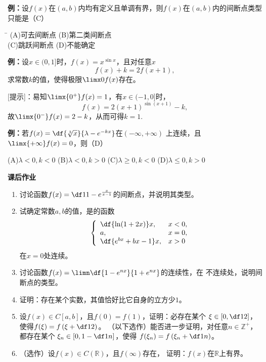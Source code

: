{\bf 例：}设$f(x)$在$(a,b)$内均有定义且单调有界，则$f(x)$在$(a,b)$内的间断点类型只能是（C）
\begin{tabbing}
	\hspace{8cm}\=\kill
	\quad\quad\quad
	(A)\;可去间断点 \> 
	(B)\;第二类间断点 \\ 
	\quad\quad\quad
	(C)\;跳跃间断点\>
	(D)\;不能确定
\end{tabbing}

{\bf 例：}设$x\in(0,1]$时，$f(x)=x^{\sin x}$，且对任意$x$
$$f(x)+k=2f(x+1),$$
求常数$k$的值，使得极限$\limx0f(x)$存在。

[提示]：易知$\limx{0^+}f(x)=1$，有$x\in(-1,0]$时，
$$f(x)=2(x+1)^{\sin(x+1)}-k,$$
故$\limx{0^-}f(x)=2-k$，从而可得$k=1$.

{\bf 例：}若$f(x)=\df{\sqrt[3]{x}}{\lambda-e^{-kx}}$在$(-\infty,+\infty)$
上连续，且$\limx{+\infty}f(x)=0$，则（D）

\quad
(A)\;$\lambda<0,k<0$\hspace{1cm}
(B)\;$\lambda<0,k>0$\hspace{1cm}
(C)\;$\lambda\geq0,k<0$\hspace{1cm}
(D)\;$\lambda\leq0,k>0$

\begin{ext}
	{\centering\bf 课后作业}
	
	\begin{enumerate}  
	  \item 讨论函数$f(x)=\df1{1-e^{\frac{x}{x-1}}}$的间断点，并说明其类型。
	  \item 试确定常数$a,b$的值，是的函数
	  $$
	  	\left\{\begin{array}{ll}
	  		\df{\ln(1+2x)}x,& x<0,\\
	  		a,& x=0,\\
	  		\df{e^{bx}+bx-1}x,& x>0
	  	\end{array}\right.
	  $$
	  在$x=0$处连续。
	  \item 讨论函数$f(x)=\limn\df{1-e^{nx}}{1+e^{nx}}$的连续性，在
	  不连续处，说明间断点的类型。
	  \item 证明：存在某个实数，其值恰好比它自身的立方少$1$。
	  \item 设$f(x)\in C[a,b]$，且$f(0)=f(1)$，证明：必存在某个
	  $\xi\in\left[0,\df12\right]$，使得$f(\xi)=f\left(\xi+\df12\right)$。
	  （以下选作）能否进一步证明，对任意$n\in\mathbb{Z}^+$，都存在某个
	  $\xi_n\in\left[0,1-\df1n\right]$，使得
	  $f(\xi_n)=f\left(\xi_n+\df1n\right)$。
	  \item （选作）设$f(x)\in C(\mathbb{R})$，且$f(\infty)$存在，
	  证明：$f(x)$在$\mathbb{R}$上有界。
	\end{enumerate}
\end{ext}

